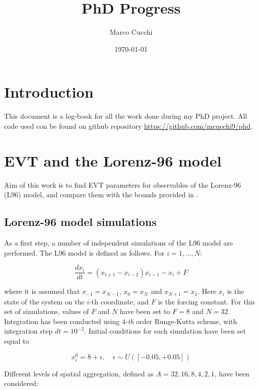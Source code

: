 \documentclass{article}
\title{PhD Progress}
\author{Marco Cucchi}
\date{\today}
\begin{document}
\maketitle
\tableofcontents
\newpage

\section{Introduction}

This document is a log-book for all the work done during my PhD project.
All code used con be found on github repository \url{https://github.com/mcucchi9/phd}.

\section{EVT and the Lorenz-96 model}

Aim of this work is to find EVT parameters for observables of the Lorenz-96 (L96) model, and compare them with the bounds provided in \cite{LucariniExtremesBook}.

\subsection{Lorenz-96 model simulations} \label{gev_sim}

As a first step, a number of independent simulations of the L96 model are performed.
The L96 model is defined as follows. For $i=1,...,N$:

\begin{equation}
\frac{dx_i}{dt} = (x_{i+1}-x_{i-2})x_{i-1} - x_i + F
\end{equation}

where it is assumed that $x_{-1}=x_{N-1}$, $x_0 = x_N$ and $x_{N+1}=x_1$. Here $x_i$ is the state of the system on the $i$-th coordinate, and $F$ is the forcing constant.
For this set of simulations, values of $F$ and $N$ have been set to $F=8$ and $N=32$.\\
Integration has been conducted using 4-\textit{th} order Runge-Kutta scheme, with integration step $dt=10^{-2}$. Initial conditions for each simulation have been set equal to

\begin{equation}
x_i^0 = 8 + \epsilon, \quad \epsilon \sim U([-0.05,+0.05])
\end{equation}

Different levels of spatial aggregation, defined as $A=32,16,8,4,2,1$, have been considered:
\end{document}
